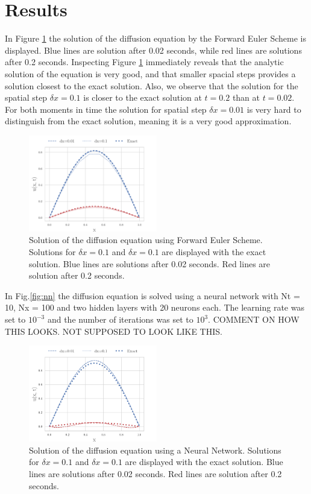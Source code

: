 \documentclass[a4paper,11pt,twocolumn]{article}
\begin{document}
\section{Results}

In Figure \ref{euler} the solution of the diffusion equation by the Forward Euler Scheme is displayed. Blue lines are solution after 0.02 seconds, while red lines are solutions after 0.2 seconds. Inspecting Figure \ref{euler} immediately reveals that the analytic solution of the equation is very good, and that smaller spacial steps provides a solution closest to the exact solution. Also, we observe that the solution for the spatial step $\delta x = 0.1$ is closer to the exact solution at $t = 0.2$ than at $t = 0.02$. For both moments in time the solution for spatial step $\delta x = 0.01$ is very hard to distinguish from the exact solution, meaning it is a very good approximation. 


\begin{figure}[h]
	\centering 
	\includegraphics[width=0.5\textwidth]{figures/euler}
	\caption{Solution of the diffusion equation using Forward Euler Scheme. Solutions for $\delta x = 0.1$ and $\delta x = 0.1$ are displayed with the exact solution. Blue lines are solutions after 0.02 seconds. Red lines are solution after 0.2 seconds.}
	\label{euler}
\end{figure}

In Fig.\ref{fig:nn} the diffusion equation is solved using a neural network with Nt = 10, Nx = 100 and two hidden layers with 20 neurons each. The learning rate was set to $10^{-3}$ and the number of iterations was set to $10^3$. COMMENT ON HOW THIS LOOKS. NOT SUPPOSED TO LOOK LIKE THIS.

\begin{figure}[h]
	\centering 
	\includegraphics[width=0.5\textwidth]{figures/NN}
	\caption{Solution of the diffusion equation using a Neural Network. Solutions for $\delta x = 0.1$ and $\delta x = 0.1$ are displayed with the exact solution. Blue lines are solutions after 0.02 seconds. Red lines are solution after 0.2 seconds.}
	\label{nn}
\end{figure}
\end{document}
